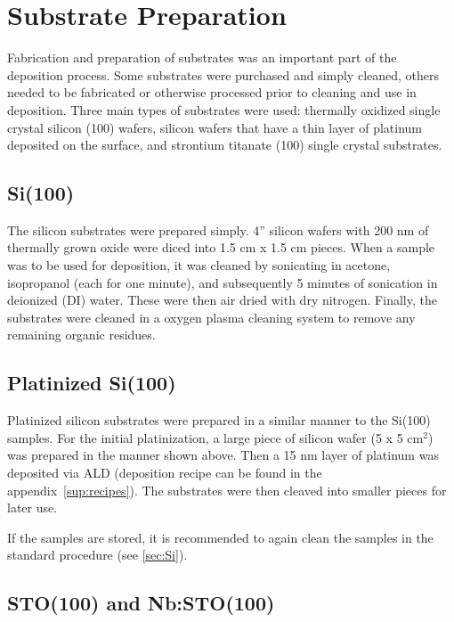 \section{Substrate Preparation}
\label{sec:SampFab-Substrates}

Fabrication and preparation of substrates was an important part of the deposition process. Some substrates were purchased and simply cleaned, others needed to be fabricated or otherwise processed prior to cleaning and use in deposition. Three main types of substrates were used: thermally oxidized single crystal silicon (100) wafers, silicon wafers that have a thin layer of platinum deposited on the surface, and strontium titanate (100) single crystal substrates. 

\subsection{Si(100)} \label{sec:Si}

The silicon substrates were prepared simply. 4'' silicon wafers with 200 nm of thermally grown oxide were diced into 1.5 cm x 1.5 cm pieces. When a sample was to be used for deposition, it was cleaned by sonicating in acetone, isopropanol (each for one minute), and subsequently 5 minutes of sonication in deionized (DI) water. These were then air dried with dry nitrogen. Finally, the substrates were cleaned in a oxygen plasma cleaning system to remove any remaining organic residues. 



\subsection{Platinized Si(100)}

Platinized silicon substrates were prepared in a similar manner to the Si(100) samples. For the initial platinization, a large piece of silicon wafer (5 x 5 cm$^{2}$) was prepared in the manner shown above. Then a 15 nm layer of platinum was deposited via ALD (deposition recipe can be found in the appendix~\vref{sup:recipes}). The substrates were then cleaved into smaller pieces for later use. 

If the samples are stored, it is recommended to again clean the samples in the standard procedure (see \vref{sec:Si}).


\subsection{STO(100) and Nb:STO(100)}

